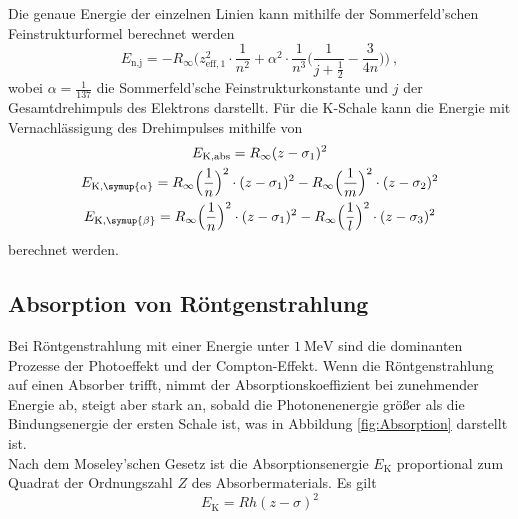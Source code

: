     Die genaue Energie der einzelnen Linien kann mithilfe der Sommerfeld'schen Feinstrukturformel berechnet werden
    \begin{equation}
        E_\text{n,j} = - R_\infty \Biggl(z_{\text{eff},1}^2 \cdot \frac{1}{n^2} + \alpha^2 \cdot \frac{1}{n^3} \Biggl(\frac{1}{j+\frac{1}{2}}- \frac{3}{4n}\Biggr)\Biggr) \ ,
        \label{eqn:Feinstrukturformel}
    \end{equation}
    wobei $\alpha = \frac{1}{137}$ die Sommerfeld'sche Feinstrukturkonstante und $j$ der Gesamtdrehimpuls des Elektrons darstellt.
    Für die K-Schale kann die Energie mit Vernachlässigung des Drehimpulses mithilfe von
    \begin{gather}
        E_\text{K,abs} = R_\infty (z - \sigma_1)^2 \\
        E_{\text{K},\symup{\alpha}} = R_\infty \Bigl(\frac{1}{n}\Bigr)^2 \cdot (z - \sigma_1)^2 -R_\infty \Bigl(\frac{1}{m}\Bigr)^2 \cdot (z - \sigma_2)^2 
        \label{eqn:EnergieKalpha}\\
        E_{\text{K},\symup{\beta}} = R_\infty \Bigl(\frac{1}{n}\Bigr)^2 \cdot (z - \sigma_1)^2 - R_\infty \Bigl(\frac{1}{l}\Bigr)^2 \cdot (z - \sigma_3)^2
        \label{eqn:EnergieKbeta}
    \end{gather}
    berechnet werden.\\
    
\subsection{Absorption von Röntgenstrahlung}

    Bei Röntgenstrahlung mit einer Energie unter $\SI{1}{\mega\electronvolt}$ sind die dominanten Prozesse der Photoeffekt und der Compton-Effekt.
    Wenn die Röntgenstrahlung auf einen Absorber trifft,
    nimmt der Absorptionskoeffizient bei zunehmender Energie ab,
    steigt aber stark an,
    sobald die Photonenenergie größer als die Bindungsenergie der ersten Schale ist,
    was in Abbildung \ref{fig:Absorption} darstellt ist.\\
    Nach dem Moseley'schen Gesetz ist die Absorptionsenergie $E_\text{K}$ proportional zum Quadrat der Ordnungszahl $Z$ des Absorbermaterials.
    Es gilt 
    \begin{equation}
        E_\text{K} = R h (z - \sigma)^2
        \label{eqn:Moseley}
    \end{equation}
    
